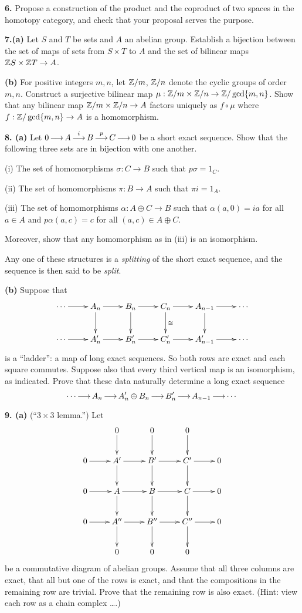 \documentclass[12pt]{article}
\begin{document}
\medskip
{\bf 6.} Propose a construction of the product and the coproduct of 
two spaces in the homotopy category, and check that your proposal serves
the purpose.
 
\medskip
{\bf 7.(a)} Let $S$ and $T$ be sets and $A$ an abelian group. Establish 
a bijection between the set of maps of sets from $S\times T$ to $A$ and
the set of bilinear maps $\mathbb Z S\times\mathbb Z T\to A$.

{\bf(b)} For positive integers $m,n$, let $\mathbb Z/m$, $\mathbb Z/n$ denote the cyclic 
groups of order $m,n$.
Construct a surjective bilinear map $\mu:\mathbb Z/m\times\mathbb Z/n\to\mathbb Z/\gcd\{m,n\}$.
Show that any bilinear map $\mathbb Z/m\times\mathbb Z/n\to A$ factors uniquely as 
$f\circ\mu$ where $f:\mathbb Z/\gcd\{m,n\}\to A$ is a homomorphism.

\medskip
{\bf8. (a)} Let $0\mathop{\longrightarrow}\limits^{}A\mathop{\longrightarrow}\limits^{i}B\mathop{\longrightarrow}\limits^{p}C\mathop{\longrightarrow}\limits^{}0$ be a short exact sequence.
Show that the following three sets are in bijection with one another.

(i) The set of homomorphisms $\sigma:C\rightarrow B$ such that $p\sigma=1_C$.

(ii) The set of homomorphisms $\pi:B\rightarrow A$ such that $\pi i=1_A$.

(iii) The set of homomorphisms $\alpha:A\oplus C\rightarrow B$ such that 
$\alpha(a,0)=ia$ for all $a\in A$ and $p\alpha(a,c)=c$ for all 
$(a,c)\in A\oplus C$.

Moreover, show that any homomorphism as in (iii) is an isomorphism.

Any one of these structures 
is a {\em splitting} of the short exact sequence, and
the sequence is then said to be {\em split}.


{\bf(b)} Suppose that 
\[
\xymatrix{
\cdots \ar[r] & A_n \ar[r] \ar[d] & B_n \ar[r] \ar[d] & C_n \ar[r] \ar[d]^\iso
& A_{n-1} \ar[r] \ar[d] & \cdots \\
\cdots \ar[r] & A'_n \ar[r] & B'_n \ar[r] & C'_n \ar[r] & 
A'_{n-1} \ar[r] & \cdots
}
\]
is a ``ladder'': a map of long exact sequences. So both rows are exact
and each square commutes. Suppose also that every third vertical map is
an isomorphism, as indicated. Prove that these data naturally 
determine a long exact sequence 
\[
\cdots\mathop{\longrightarrow}\limits^{}A_n\mathop{\longrightarrow}\limits^{}A'_n\oplus B_n\mathop{\longrightarrow}\limits^{}B'_n\mathop{\longrightarrow}\limits^{}A_{n-1}\mathop{\longrightarrow}\limits^{}\cdots
\]

\medskip
{\bf 9. (a)} (``$3\times3$ lemma.'') Let  
\[
\xymatrix{
& 0 \ar[d] & 0 \ar[d] & 0 \ar[d] \\
0 \ar[r] & A' \ar[d] \ar[r] & B' \ar[d] \ar[r] & C' \ar[d] \ar[r] & 0 \\
0 \ar[r] & A \ar[d] \ar[r] & B \ar[d] \ar[r] & C \ar[d] \ar[r] & 0 \\
0 \ar[r] & A'' \ar[d] \ar[r] & B'' \ar[d] \ar[r] & C'' \ar[d] \ar[r] & 0 \\
& 0 & 0 & 0
}
\]
be a commutative diagram of abelian groups. Assume that all three
columns are exact, that all but one of the rows is exact,
and that the compositions in the remaining row are trivial.
Prove that the remaining row is also exact. (Hint: view each 
row as a chain complex \ldots.)
\end{document}

